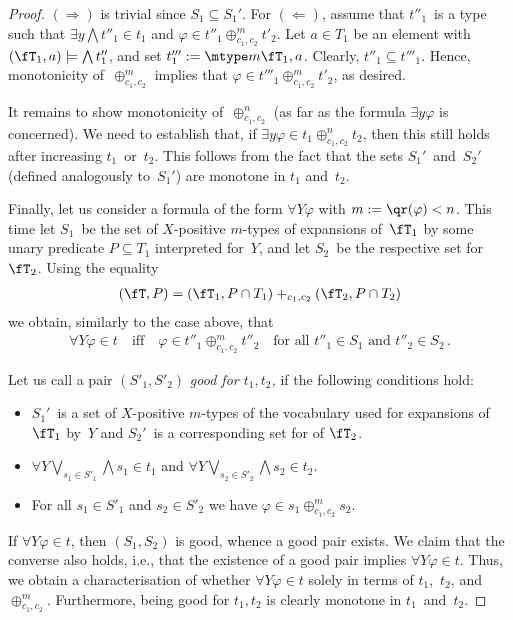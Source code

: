 \documentclass{LMCS}
\begin{document}
\begin{proof}
$(\Rightarrow)$ is trivial since $S_1\subseteq S_1'$.
For $(\Leftarrow)$,
assume that $t''_1$~is a type such that
$\exists y\bigwedge t''_1\in t_1$ and $\varphi\in t''_1\oplus^m_{c_1,c_2}t'_2$.
Let $a\in T_1$ be an element with $(\fT_1,a) \models \bigwedge t''_1$,
and set $t'''_1 := \mtype m{\fT_1,a}$.
Clearly, $t''_1 \subseteq t'''_1$.
Hence, monotonicity of~$\oplus^m_{c_1,c_2}$
implies that $\varphi \in t'''_1\oplus^m_{c_1,c_2}t'_2$, as desired.

It remains to show monotonicity of~$\oplus^n_{c_1,c_2}$
(as far as the formula $\exists y\varphi$ is concerned).
We need to establish that, if $\exists y\varphi\in t_1\oplus^n_{c_1,c_2}t_2$,
then this still holds after increasing $t_1$~or~$t_2$.
This follows from the fact
that the sets $S_1'$~and~$S_2'$ (defined analogously to~$S_1'$)
are monotone in $t_1$ and~$t_2$.

\smallskip
Finally, let us consider a formula of the form $\forall Y\varphi$
with $m := \qr(\varphi) < n$.
This time let $S_1$~be the set of $X$-positive $m$-types
of expansions of~$\fT_1$ by some unary predicate $P\subseteq T_1$ interpreted for~$Y$,
and let $S_2$~be the respective set for~$\fT_2$.
Using the equality
\begin{align*}
  (\fT,P) = (\fT_1,P\cap T_1) +_{c_1,c_2} (\fT_2,P\cap T_2)
\end{align*}
we obtain, similarly to the case above, that
\begin{align*}
  \forall Y\varphi\in t
  \quad\text{iff}\quad
  \varphi\in t''_1\oplus^m_{c_1,c_2}t''_2
  \quad\text{for all } t''_1\in S_1 \text{ and } t''_2\in S_2\,.
\end{align*}

Let us call a pair $(S'_1,S'_2)$
\emph{good for $t_1,t_2$,} if the following conditions hold\?:
\begin{itemize}
\item $S_1'$~is a set of $X$-positive $m$-types
  of the vocabulary used for expansions of $\fT_1$ by~$Y$ and
  $S_2'$~is a corresponding set for of $\fT_2$.
\item $\forall Y\bigvee_{s_1\in S'_1}\bigwedge s_1 \in t_1$
  and $\forall Y\bigvee_{s_2\in S'_2}\bigwedge s_2 \in t_2$.
\item For all $s_1\in S'_1$ and $s_2\in S'_2$
  we have $\varphi\in s_1\oplus^m_{c_1,c_2}s_2$.
\end{itemize}
If $\forall Y\varphi\in t$, then $(S_1,S_2)$ is good, whence a good pair exists.
We claim that the converse also holds, i.e., that
the existence of a good pair implies $\forall Y\varphi \in t$.
Thus, we obtain a characterisation of whether $\forall Y\varphi\in t$
solely in terms of $t_1$,~$t_2$, and~$\oplus^m_{c_1,c_2}$.
Furthermore, being good for $t_1,t_2$
is clearly monotone in $t_1$~and~$t_2$.


\end{proof}
\end{document}
